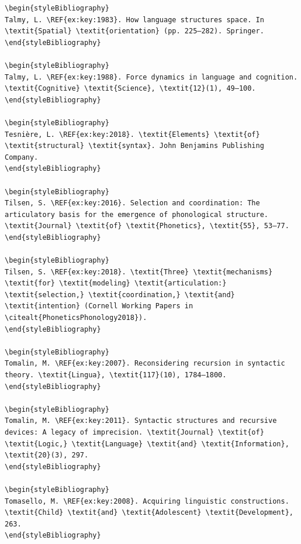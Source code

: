 \begin{verbatim}
\begin{styleBibliography}
Talmy, L. \REF{ex:key:1983}. How language structures space. In \textit{Spatial} \textit{orientation} (pp. 225–282). Springer.
\end{styleBibliography}

\begin{styleBibliography}
Talmy, L. \REF{ex:key:1988}. Force dynamics in language and cognition. \textit{Cognitive} \textit{Science}, \textit{12}(1), 49–100.
\end{styleBibliography}

\begin{styleBibliography}
Tesnière, L. \REF{ex:key:2018}. \textit{Elements} \textit{of} \textit{structural} \textit{syntax}. John Benjamins Publishing Company.
\end{styleBibliography}

\begin{styleBibliography}
Tilsen, S. \REF{ex:key:2016}. Selection and coordination: The articulatory basis for the emergence of phonological structure. \textit{Journal} \textit{of} \textit{Phonetics}, \textit{55}, 53–77.
\end{styleBibliography}

\begin{styleBibliography}
Tilsen, S. \REF{ex:key:2018}. \textit{Three} \textit{mechanisms} \textit{for} \textit{modeling} \textit{articulation:} \textit{selection,} \textit{coordination,} \textit{and} \textit{intention} (Cornell Working Papers in \citealt{PhoneticsPhonology2018}).
\end{styleBibliography}

\begin{styleBibliography}
Tomalin, M. \REF{ex:key:2007}. Reconsidering recursion in syntactic theory. \textit{Lingua}, \textit{117}(10), 1784–1800.
\end{styleBibliography}

\begin{styleBibliography}
Tomalin, M. \REF{ex:key:2011}. Syntactic structures and recursive devices: A legacy of imprecision. \textit{Journal} \textit{of} \textit{Logic,} \textit{Language} \textit{and} \textit{Information}, \textit{20}(3), 297.
\end{styleBibliography}

\begin{styleBibliography}
Tomasello, M. \REF{ex:key:2008}. Acquiring linguistic constructions. \textit{Child} \textit{and} \textit{Adolescent} \textit{Development}, 263.
\end{styleBibliography}


\end{verbatim}
